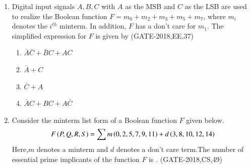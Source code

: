 \begin{enumerate}[label=\arabic*.,ref=\theenumi]
		
\item Digital input signals $A, B, C$ with $A$ as the MSB and $C$ as the LSB are used to realize the Boolean function $F=m_0+m_2+m_3+m_5+m_7$, where $m_i$ denotes the $i^{th}$ minterm. In addition, $F$ has a don't care for $m_1$. The simplified expression for $F$ is given by 
\hfill (GATE-2018,EE,37)
\begin{enumerate}
    \item $\bar{A} \bar{C}+\bar{B} C+A C$
    \item$\bar{A}+C$
    \item$\bar{C}+A$ 
    \item$\bar{A} C+BC+A\bar{C}$
\end{enumerate}
\item Consider the minterm list form of a Boolean function $F$ given below.
\begin{align}
	F\left(P,Q,R,S\right)=\sum m\left(0,2,5,7,9,11\right)+d\left(3,8,10,12,14\right)
\end{align}
Here,$m$ denotes a minterm and $d$ denotes a don't care term.The number of essential prime implicants of the function $F$ is \underline{\hspace{2cm}} . 	
	\hfill (GATE-2018,CS,49)

\end{enumerate}




